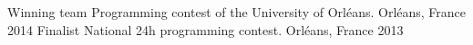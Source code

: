\begin{cvhonors}
  \cvhonor
    {Winning team}
    {Programming contest of the University of Orléans.}
    {Orléans, France}
    {2014}
  \cvhonor
    {Finalist}
    {National 24h programming contest.}
    {Orléans, France}
    {2013}
\end{cvhonors}
